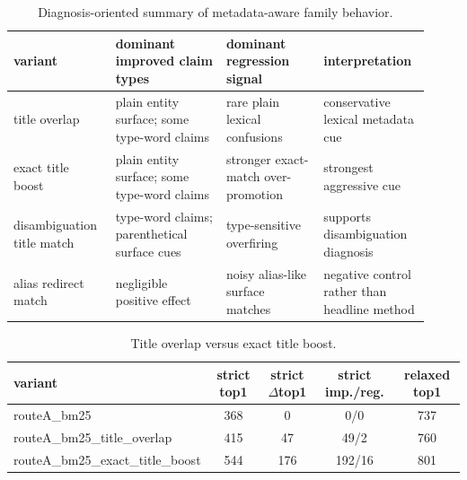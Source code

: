 \begin{table}[t]
\centering
\caption{Diagnosis-oriented summary of metadata-aware family behavior.}
\begin{tabular}{p{0.23\linewidth}p{0.25\linewidth}p{0.22\linewidth}p{0.22\linewidth}}
\hline
variant & dominant improved claim types & dominant regression signal & interpretation \\
\hline
title overlap & plain entity surface; some type-word claims & rare plain lexical confusions & conservative lexical metadata cue \\
exact title boost & plain entity surface; some type-word claims & stronger exact-match over-promotion & strongest aggressive cue \\
disambiguation title match & type-word claims; parenthetical surface cues & type-sensitive overfiring & supports disambiguation diagnosis \\
alias redirect match & negligible positive effect & noisy alias-like surface matches & negative control rather than headline method \\
\hline
\end{tabular}
\end{table}

\begin{table}[t]
\centering
\caption{Title overlap versus exact title boost.}
\begin{tabular}{lcccc}
\hline
variant & strict top1 & strict $\Delta$top1 & strict imp./reg. & relaxed top1 \\
\hline
routeA\_bm25 & 368 & 0 & 0/0 & 737 \\
routeA\_bm25\_title\_overlap & 415 & 47 & 49/2 & 760 \\
routeA\_bm25\_exact\_title\_boost & 544 & 176 & 192/16 & 801 \\
\hline
\end{tabular}
\end{table}
